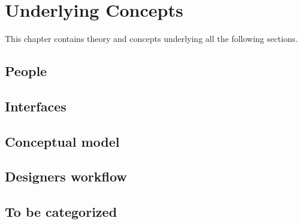 \chapter{Underlying Concepts} \label{chap:concepts}
This chapter contains theory and concepts underlying all the following sections.

\section{People}



\section{Interfaces}


\section{Conceptual model} \label{sec:conceptual_model}




\section{Designers workflow}


\section{To be categorized}
